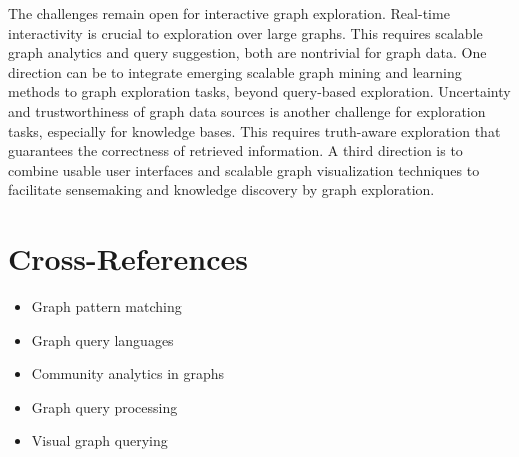 \documentclass[graybox, natbib, nosecnum, twocolumn]{svmult}
\newcommand{\eat}[1]{}
\begin{document}
The challenges remain open for interactive graph 
exploration. Real-time interactivity is 
crucial to exploration over large graphs. 
This requires scalable graph analytics and 
query suggestion, both are nontrivial for 
graph data. One direction can be to 
integrate emerging scalable graph mining 
and learning methods
to graph exploration tasks, beyond query-based 
exploration. Uncertainty and trustworthiness of 
graph data sources is another challenge 
for exploration tasks, especially for 
knowledge bases. This requires 
truth-aware exploration that guarantees 
the correctness of retrieved information. 
A third direction is to combine 
usable user interfaces and 
scalable graph visualization 
techniques to facilitate 
sensemaking and knowledge discovery 
by graph exploration.  

\section{Cross-References}

\begin{itemize}
\item Graph pattern matching
\item Graph query languages
\item Community analytics in graphs
\item Graph query processing
\item Visual graph querying
\end{itemize}






\end{document}
